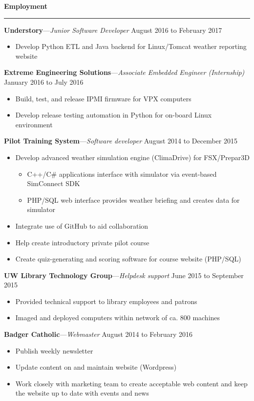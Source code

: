 \documentclass[12pt,letterpaper]{article}
\newenvironment{details}{
    \vspace{-.8em}
    \begin{itemize}
        \renewcommand \labelitemi{\labelitemiv}
        \setlength{\itemsep}{0pt}
        \setlength{\parskip}{-1pt}
        \setlength{\parsep}{0pt}
    }{
    \end{itemize}
    \vspace{-.5em}
}
\newcommand{\hr} {
    \vspace{-1em}
    \par\rule{\textwidth}{1pt}
    \vspace{-1.5em}
}
\newcommand{\ressection}[1] {
    \par{\large \textbf{#1}}
    \hr
}
\newenvironment{employment} {
    \setlength{\parskip}{0pt}
    \ressection{Employment}
}{
    \vspace{0.5em}
}
\newcommand{\employer}[3] {
    {\par\textbf{#1}---\textit{#2} \hfill #3}
    \par
}
\begin{document}
\begin{employment} 
\employer{Understory}{Junior Software Developer}{August 2016 to February 2017}
\begin{details}
    \item Develop Python ETL and Java backend for Linux/Tomcat weather reporting website
\end{details}

\employer{Extreme Engineering Solutions}{Associate Embedded Engineer (Internship)}{January 2016 to July 2016}
\begin{details}
    \item Build, test, and release IPMI firmware for VPX computers
    \item Develop release testing automation in Python for on-board Linux environment
\end{details}

\employer{Pilot Training System}{Software developer}{August 2014 to December 2015}
\begin{details}
    \item Develop advanced weather simulation engine (ClimaDrive) for FSX/Prepar3D
    \vspace{.5em}
    \begin{details}
        \item C++/C\# applications interface with simulator via event-based SimConnect SDK
        \item PHP/SQL web interface provides weather briefing and creates data for simulator
    \end{details}
    \item Integrate use of GitHub to aid collaboration
    \item Help create introductory private pilot course
    \item Create quiz-generating and scoring software for course website (PHP/SQL)
\end{details}

\employer{UW Library Technology Group}{Helpdesk support}{June 2015 to September 2015}
\begin{details}
    \item Provided technical support to library employees and patrons
    \item Imaged and deployed computers within network of ca. 800 machines
\end{details}

\employer{Badger Catholic}{Webmaster}{August 2014 to February 2016}
\begin{details}
    \item Publish weekly newsletter
    \item Update content on and maintain website (Wordpress)
    \item Work closely with marketing team to create acceptable web content and keep the website up to date with events and news
\end{details}


\end{employment}
\end{document}
